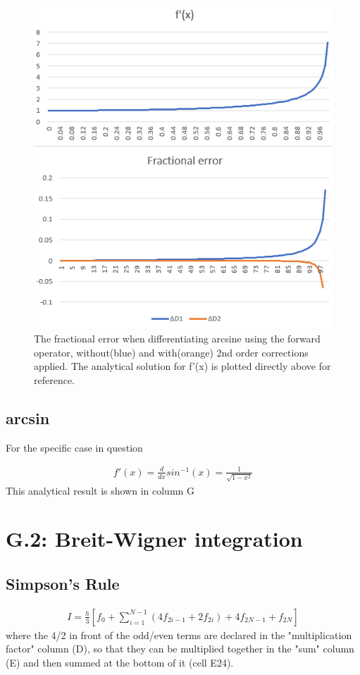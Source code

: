 \documentclass[a4paper, 12pt]{article}
\begin{document}
\begin{figure}[!h]
\centering
\includegraphics{2.PNG}
\caption{The fractional error when differentiating arcsine using the forward operator, without(blue) and with(orange) 2nd order corrections applied. The analytical solution for f'(x) is plotted directly above for reference.}\label{2png}
\end{figure}

\subsection{arcsin}

For the specific case in question

\begin{align}
f'(x)=\frac{d}{dx}sin^{-1}(x)=\frac{1}{\sqrt{1-x^2}}
\end{align}
This analytical result is shown in column G

\section{G.2: Breit-Wigner integration}

\subsection{Simpson's Rule}
\begin{align}
I=\frac{h}{3}[f_0+\sum\limits_{i=1}^{N-1}(4f_{2i-1}+2f_{2i}) + 4f_{2N-1}+f_{2N}]
\end{align}
where the 4/2 in front of the odd/even terms are declared in the "multiplication factor" column (D), so that they can be multiplied together in the "sum" column (E) and then summed at the bottom of it (cell E24).
\end{document}
